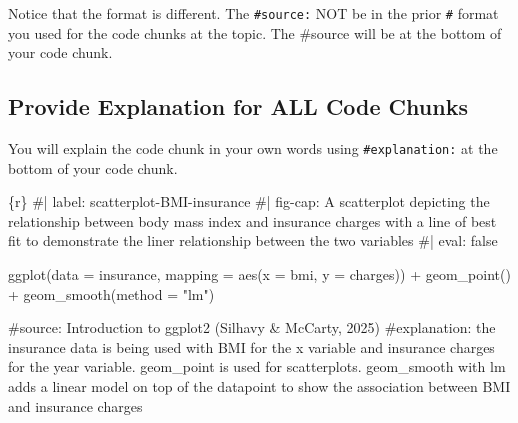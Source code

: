 \documentclass[
  english,
  letterpaper,
  DIV=11,
  numbers=noendperiod]{scrreprt}
\newenvironment{Shaded}{\begin{snugshade}}{\end{snugshade}}
\newcommand{\AttributeTok}[1]{\textcolor[rgb]{0.40,0.45,0.13}{#1}}
\newcommand{\CommentTok}[1]{\textcolor[rgb]{0.37,0.37,0.37}{#1}}
\newcommand{\FunctionTok}[1]{\textcolor[rgb]{0.28,0.35,0.67}{#1}}
\newcommand{\InformationTok}[1]{\textcolor[rgb]{0.37,0.37,0.37}{#1}}
\newcommand{\NormalTok}[1]{\textcolor[rgb]{0.00,0.23,0.31}{#1}}
\newcommand{\SpecialCharTok}[1]{\textcolor[rgb]{0.37,0.37,0.37}{#1}}
\newcommand{\StringTok}[1]{\textcolor[rgb]{0.13,0.47,0.30}{#1}}
\begin{document}
Notice that the format is different. The \texttt{\#source:} NOT be in
the prior \texttt{\#\textbar{}} format you used for the code chunks at
the topic. The \#source will be at the bottom of your code chunk.

\subsection{Provide Explanation for ALL Code
Chunks}\label{provide-explanation-for-all-code-chunks}

\begin{tcolorbox}[enhanced jigsaw, title=\textcolor{quarto-callout-important-color}{\faExclamation}\hspace{0.5em}{Requirement}, opacityback=0, colframe=quarto-callout-important-color-frame, rightrule=.15mm, left=2mm, toprule=.15mm, leftrule=.75mm, titlerule=0mm, bottomtitle=1mm, breakable, arc=.35mm, toptitle=1mm, bottomrule=.15mm, coltitle=black, opacitybacktitle=0.6, colback=white, colbacktitle=quarto-callout-important-color!10!white]

You will explain the code chunk in your own words using
\texttt{\#explanation:} at the bottom of your code chunk.

\end{tcolorbox}

\begin{Shaded}
\begin{Highlighting}[]
\InformationTok{\textasciigrave{}\textasciigrave{}\textasciigrave{}\{r\}}
\CommentTok{\#| label: scatterplot{-}BMI{-}insurance}
\CommentTok{\#| fig{-}cap: A scatterplot depicting the relationship between body mass index and insurance charges with a line of best fit to demonstrate the liner relationship between the two variables}
\CommentTok{\#| eval: false}

\FunctionTok{ggplot}\NormalTok{(}\AttributeTok{data =}\NormalTok{ insurance, }\AttributeTok{mapping =} \FunctionTok{aes}\NormalTok{(}\AttributeTok{x =}\NormalTok{ bmi, }\AttributeTok{y =}\NormalTok{ charges)) }\SpecialCharTok{+}
  \FunctionTok{geom\_point}\NormalTok{() }\SpecialCharTok{+}
  \FunctionTok{geom\_smooth}\NormalTok{(}\AttributeTok{method =} \StringTok{"lm"}\NormalTok{)}

\CommentTok{\#source: Introduction to ggplot2 (Silhavy \& McCarty, 2025)}
\CommentTok{\#explanation: the insurance data is being used with BMI for the x variable and insurance charges for the year variable. geom\_point is used for scatterplots. geom\_smooth with lm adds a linear model on top of the datapoint to show the association between BMI and insurance charges}
\InformationTok{\textasciigrave{}\textasciigrave{}\textasciigrave{}}
\end{Highlighting}
\end{Shaded}
\end{document}
